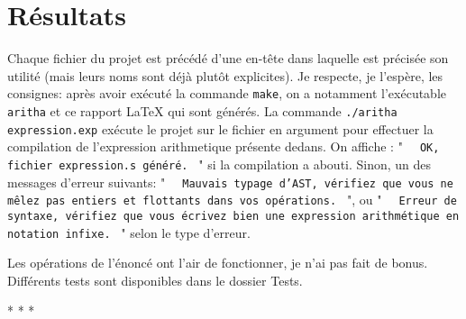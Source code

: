 \documentclass[12pt,french]{article}
\newcommand{\inlinecode}[1]{%
  \texttt{%
    \setlength{\spaceskip}{0.5em plus 1em minus 0.1em}%
    \ifdim\lastskip>0pt \unskip\hspace{0.5em plus 0.5em minus 0.1em}\fi
    #1
  }%
}
\begin{document}
\section{Résultats}
Chaque fichier du projet est précédé d'une en-tête dans laquelle est précisée son utilité (mais leurs noms sont déjà plutôt explicites). Je respecte, je l'espère, les consignes: après avoir exécuté la commande \texttt{make}, on a notamment l'exécutable \texttt{aritha} et ce rapport {\LaTeX}  qui sont générés. La commande \texttt{./aritha expression.exp} exécute le projet sur le fichier en argument pour effectuer la compilation de l'expression arithmetique présente dedans. On affiche : "\inlinecode{OK, fichier expression.s généré.}" si la compilation a abouti. Sinon, un des messages d'erreur suivants: "\inlinecode{Mauvais typage d'AST, vérifiez que vous ne mêlez pas entiers et flottants dans vos opérations.}", ou "\inlinecode{Erreur de syntaxe, vérifiez que vous écrivez bien une expression arithmétique en notation infixe.}" selon le type d'erreur. \par
Les opérations de l'énoncé ont l'air de fonctionner, je n'ai pas fait de bonus. Différents tests sont disponibles dans le dossier \textsf{Tests}.\newline
\newline
\begin{center}
    *  *  *
\end{center}
\end{document}
